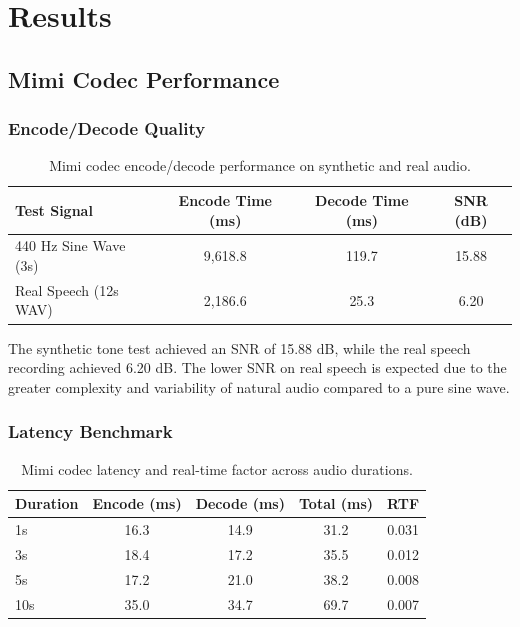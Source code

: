 \documentclass[12pt,a4paper]{report}
\begin{document}
\chapter{Results}

\section{Mimi Codec Performance}

\subsection{Encode/Decode Quality}

\begin{table}[H]
\centering
\caption{Mimi codec encode/decode performance on synthetic and real audio.}
\label{tab:codec_quality}
\begin{tabular}{@{}lccc@{}}
\toprule
\textbf{Test Signal} & \textbf{Encode Time (ms)} & \textbf{Decode Time (ms)} & \textbf{SNR (dB)} \\
\midrule
440 Hz Sine Wave (3s) & 9,618.8 & 119.7 & 15.88 \\
Real Speech (12s WAV) & 2,186.6 & 25.3 & 6.20 \\
\bottomrule
\end{tabular}
\end{table}

The synthetic tone test achieved an SNR of 15.88 dB, while the real speech recording achieved 6.20 dB. The lower SNR on real speech is expected due to the greater complexity and variability of natural audio compared to a pure sine wave.

\subsection{Latency Benchmark}

\begin{table}[H]
\centering
\caption{Mimi codec latency and real-time factor across audio durations.}
\label{tab:latency}
\begin{tabular}{@{}lcccc@{}}
\toprule
\textbf{Duration} & \textbf{Encode (ms)} & \textbf{Decode (ms)} & \textbf{Total (ms)} & \textbf{RTF} \\
\midrule
1s & 16.3 & 14.9 & 31.2 & 0.031 \\
3s & 18.4 & 17.2 & 35.5 & 0.012 \\
5s & 17.2 & 21.0 & 38.2 & 0.008 \\
10s & 35.0 & 34.7 & 69.7 & 0.007 \\
\bottomrule
\end{tabular}
\end{table}
\end{document}
